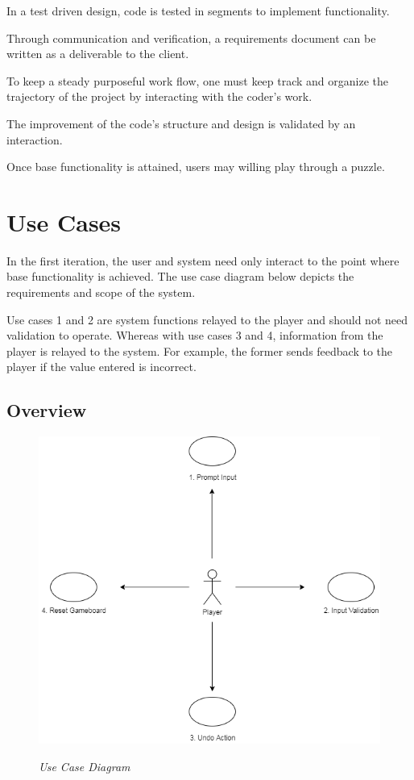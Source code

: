 \documentclass[12pt]{article}
\begin{document}
\begin{description}[font=$\bullet$~\normalfont\scshape\color{red!50!black}] 
\item [Coders] In a test driven design, code is tested in segments to implement functionality.
\item [Documenters] Through communication and verification, a requirements document can be written as a deliverable to the client.
\item [Organizers] To keep a steady purposeful work flow, one must keep track and organize the trajectory of the project by interacting with the coder's work.    
\item [Quality Assurance] The improvement of the code's structure and design is validated by an interaction.
\item [Players] Once base functionality is attained, users may willing play through a puzzle. 
\end{description}

\newpage
\pagestyle{plain} 
\section{Use Cases}

In the first iteration, the user and system need only interact to the point where base functionality is achieved. The use case diagram below depicts the requirements and scope of the system.

Use cases 1 and 2 are system functions relayed to the player and should not need validation to operate. Whereas with use cases 3 and 4, information from the player is relayed to the system. For example, the former sends feedback to the player if the value entered is incorrect.


\subsection{Overview}

\begin{figure}[htbp]
\centerline{\includegraphics[scale=.6]{Usecase Diagram.png}}
\centerline{\textit {Use Case Diagram}}
\end{figure}
\end{document}
